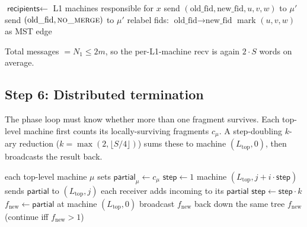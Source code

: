 \documentclass[11pt]{article}
\begin{document}
\begin{algorithm}[h]
\caption{Direct top-to-L1 decision delivery}
\label{alg:downward}
\begin{algorithmic}[1]
    \State $\textsf{recipients} \gets$ L1 machines responsible for $x$
            \State send $(\text{old\_fid}, \text{new\_fid}, u, v, w)$ to $\mu'$
        \Else
            \State send $(\text{old\_fid}, \textsc{no\_merge})$ to $\mu'$
        \EndIf
    \EndFor
\EndFor
\State {}
    \State relabel fids: $\text{old\_fid} \to \text{new\_fid}$
    \State mark $(u, v, w)$ as MST edge
\EndFor
\end{algorithmic}
\end{algorithm}

Total messages $= N_1 \le 2m$, so the per-L1-machine recv is again
$2 \cdot S$ words on average.

\subsection{Step 6: Distributed termination}

The phase loop must know whether more than one fragment survives. Each
top-level machine first counts its locally-surviving fragments
$c_\mu$. A step-doubling $k$-ary reduction ($k = \max(2, \lfloor S/4 \rfloor)$)
sums these to machine $(L_\text{top}, 0)$, then broadcasts the result back.

\begin{algorithm}[h]
\caption{Step-doubling $k$-ary distributed termination}
\label{alg:termination}
\begin{algorithmic}[1]
\State each top-level machine $\mu$ sets $\textsf{partial}_\mu \gets c_\mu$
\State $\textsf{step} \gets 1$
 
            \State machine $(L_\text{top}, j + i \cdot \textsf{step})$
                   sends $\textsf{partial}$ to $(L_\text{top}, j)$
        \EndFor
    \EndFor
    \State each receiver adds incoming to its $\textsf{partial}$
    \State $\textsf{step} \gets \textsf{step} \cdot k$
\EndWhile
\State $f_\text{new} \gets \textsf{partial}$ at machine $(L_\text{top}, 0)$
\State broadcast $f_\text{new}$ back down the same tree
\State \Return $f_\text{new}$ (continue iff $f_\text{new} > 1$)
\end{algorithmic}
\end{algorithm}
\end{document}

